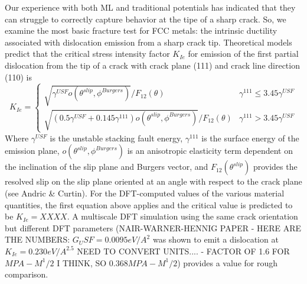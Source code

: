 \documentclass{article}
\begin{document}
Our experience with both ML and traditional potentials has indicated that they can struggle to correctly capture behavior at the tipe of a sharp crack. 
So, we examine the most basic fracture test for FCC metals: the intrinsic ductility associated with dislocation emission from a sharp crack tip.
Theoretical models predict that the critical stress intensity factor $K_{Ie}$ for emission of the first partial dislocation from the tip of a crack with crack plane (111) and crack line direction (110) is
\begin{equation}
K_{Ie} =
\begin{cases}
\sqrt{\gamma^{USF}o(\theta^{slip},\phi^{Burgers})}/F_{12}(\theta) & \gamma^{111} \leq 3.45\gamma^{USF}\\
 \sqrt{(0.5\gamma^{USF}+0.145\gamma^{111})o(\theta^{slip},\phi^{Burgers})}/F_{12}(\theta) & \gamma^{111} > 3.45\gamma^{USF}
\end{cases}
\end{equation}
Where $\gamma^{USF}$ is the unstable stacking fault energy, $\gamma^{111}$  is the surface energy of the emission plane, $o(\theta^{slip},\phi^{Burgers})$ is an anisotropic elasticity term dependent on the inclination of the slip plane and Burgers vector, and $F_{12}(\theta^{slip})$ provides the resolved slip on the slip plane oriented at an angle with respect to the crack plane (see Andric \& Curtin\cite{Andric2019AtomisticFracture}).  For the DFT-computed values of the various material quantities, the first equation above applies and the critical value is predicted to be $K_{Ie}=XXXX$.  A multiscale DFT simulation using the same crack orientation but different DFT parameters (NAIR-WARNER-HENNIG PAPER - HERE ARE THE NUMBERS: $G_USF = 0.0095 eV/A^2$ was shown to emit a dislocation at $K_{Ie}=0.230 eV/A^{2.5}$  NEED TO CONVERT UNITS.... - FACTOR OF 1.6 FOR $MPA-M^1/2$ I THINK, SO $0.368 MPA-M^1/2$) provides a value for rough comparison.
\end{document}

